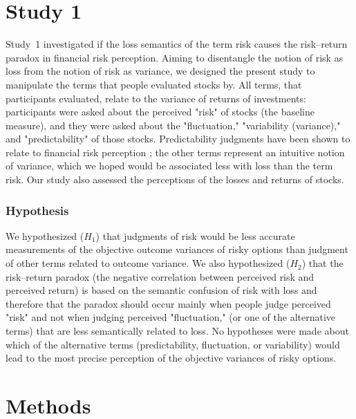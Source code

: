 \documentclass[a4paper,man, natbib,floatsintext]{apa6} %
\begin{document}
\section{Study 1}
Study~1 investigated if the loss semantics of the term risk causes the risk--return paradox in financial risk perception. Aiming to disentangle the notion of risk as loss from the notion of risk as variance, we designed the present study to manipulate the terms that people evaluated stocks by. All terms, that participants evaluated, relate to the variance of returns of investments: participants were asked about the perceived "risk" of stocks (the baseline measure), and they were asked about the "fluctuation," "variability (variance)," and "predictability" of those stocks. Predictability judgments have been shown to relate to financial risk perception \citep{Sachse2012}; the other terms represent an intuitive notion of variance, which we hoped would be associated less with loss than the term risk. Our study also assessed the perceptions of the losses and returns of stocks.


\subsubsection{Hypothesis}
We hypothesized ($H_1$) that judgments of risk would be less accurate measurements of the objective outcome variances of risky options than judgment of other terms related to outcome variance. We also hypothesized ($H_2$) that the risk--return paradox (the negative correlation between perceived risk and perceived return) is based on the semantic confusion of risk with loss and therefore that the paradox should occur mainly when people judge perceived "risk" and not when judging perceived "fluctuation," (or one of the alternative terms) that are less semantically related to loss. No hypotheses were made about which of the alternative terms (predictability, fluctuation, or variability) would lead to the most precise perception of the objective variances of risky options.

\section{Methods}
\end{document}
